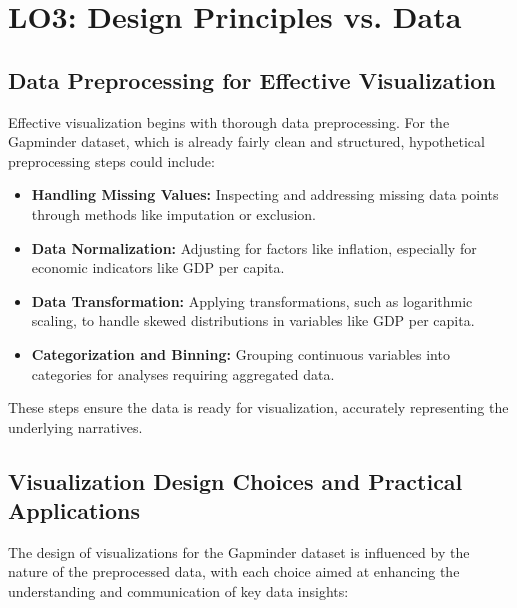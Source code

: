 \section{LO3: Design Principles vs. Data}

\subsection{Data Preprocessing for Effective Visualization}
Effective visualization begins with thorough data preprocessing. For the Gapminder dataset, which is already fairly clean and structured, hypothetical preprocessing steps could include:

\begin{itemize}
  \item \textbf{Handling Missing Values:} Inspecting and addressing missing data points through methods like imputation or exclusion.
  \item \textbf{Data Normalization:} Adjusting for factors like inflation, especially for economic indicators like GDP per capita.
  \item \textbf{Data Transformation:} Applying transformations, such as logarithmic scaling, to handle skewed distributions in variables like GDP per capita.
  \item \textbf{Categorization and Binning:} Grouping continuous variables into categories for analyses requiring aggregated data.
\end{itemize}

These steps ensure the data is ready for visualization, accurately representing the underlying narratives.

\subsection{Visualization Design Choices and Practical Applications}
The design of visualizations for the Gapminder dataset is influenced by the nature of the preprocessed data, with each choice aimed at enhancing the understanding and communication of key data insights:

